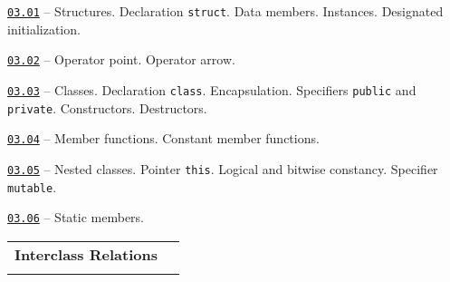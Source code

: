 \documentclass[a4paper,12pt]{article}
\renewenvironment{itemize}
{
    \begin{list}{\labelitemi}
    {
      \setlength{\topsep}{0pt}
      \setlength{\partopsep}{0pt}
      \setlength{\parskip}{0pt}
      \setlength{\itemsep}{0pt}
      \setlength{\parsep}{0pt}
      \setlength{\leftmargin}{14.5pt}
    }
}{\end{list}}
\begin{document}
\begin{itemize}

    \item \href{https://github.com/i-s-m-mipt/Education/blob/master/projects/examples/source/03.01.cpp}{\texttt{03.01}} -- Structures. Declaration \lstinline{struct}. Data members. Instances. Designated initialization.

    \smallskip

    \item \href{https://github.com/i-s-m-mipt/Education/blob/master/projects/examples/source/03.02.cpp}{\texttt{03.02}} -- Operator point. Operator arrow.

    \smallskip

    \item \href{https://github.com/i-s-m-mipt/Education/blob/master/projects/examples/source/03.03.cpp}{\texttt{03.03}} -- Classes. Declaration \lstinline{class}. Encapsulation. Specifiers \lstinline{public} and \lstinline{private}. Constructors. Destructors.

    \smallskip

    \item \href{https://github.com/i-s-m-mipt/Education/blob/master/projects/examples/source/03.04.cpp}{\texttt{03.04}} -- Member functions. Constant member functions.

    \smallskip

    \item \href{https://github.com/i-s-m-mipt/Education/blob/master/projects/examples/source/03.05.cpp}{\texttt{03.05}} -- Nested classes. Pointer \lstinline{this}. Logical and bitwise constancy. Specifier \lstinline{mutable}.

    \smallskip

    \item \href{https://github.com/i-s-m-mipt/Education/blob/master/projects/examples/source/03.06.cpp}{\texttt{03.06}} -- Static members.

\end{itemize}

\bigskip\medskip

\begin{tabular}{!{\vrule width 1pt}L{3.8cm}!{\vrule width 1pt}L{15.2cm}!{\vrule width 0pt}} 


\textbf{Interclass Relations} & \\


\end{tabular}
\end{document}
